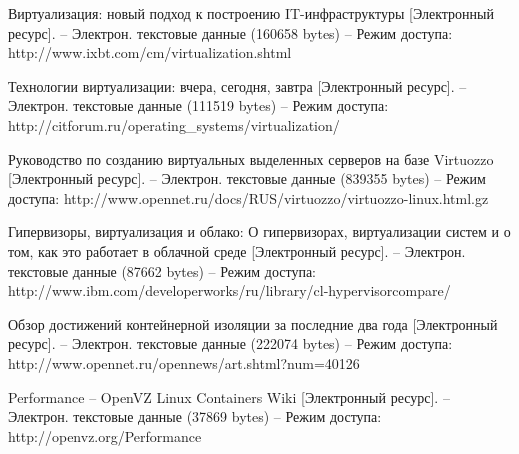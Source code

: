 \begin{thebibliography}{00}
    Виртуализация: новый подход к построению IT-инфраструктуры
    [Электронный ресурс]. --
    Электрон. текстовые данные (160658 bytes) --
    Режим доступа: http://www.ixbt.com/cm/virtualization.shtml

    Технологии виртуализации: вчера, сегодня, завтра
    [Электронный ресурс]. --
    Электрон. текстовые данные (111519 bytes) --
    Режим доступа: http://citforum.ru/operating\_systems/virtualization/

    Руководство по созданию виртуальных выделенных серверов на базе Virtuozzo
    [Электронный ресурс]. --
    Электрон. текстовые данные (839355 bytes) --
    Режим доступа: http://www.opennet.ru/docs/RUS/virtuozzo/virtuozzo-linux.html.gz

    Гипервизоры, виртуализация и облако: О гипервизорах, виртуализации систем и о том, как это работает в облачной среде
    [Электронный ресурс]. --
    Электрон. текстовые данные (87662 bytes) --
    Режим доступа: http://www.ibm.com/developerworks/ru/library/cl-hypervisorcompare/

    Обзор достижений контейнерной изоляции за последние два года
    [Электронный ресурс]. --
    Электрон. текстовые данные (222074 bytes) -- 
    Режим доступа: http://www.opennet.ru/opennews/art.shtml?num=40126

    Performance -- OpenVZ Linux Containers Wiki
    [Электронный ресурс]. --
    Электрон. текстовые данные (37869 bytes) --
    Режим доступа: http://openvz.org/Performance

\end{thebibliography}
\endgroup

\clearpage
